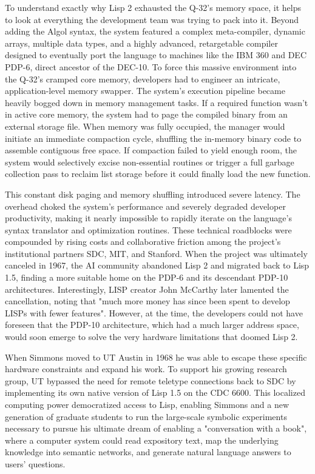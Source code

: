 To understand exactly why Lisp 2 exhausted the Q-32's memory space, it helps to look at everything the development team was trying to pack into it. Beyond adding the Algol syntax, the system featured a complex meta-compiler, dynamic arrays, multiple data types, and a highly advanced, retargetable compiler designed to eventually port the language to machines like the IBM 360 and DEC PDP-6, direct ancestor of the DEC-10. To force this massive environment into the Q-32's cramped core memory, developers had to engineer an intricate, application-level memory swapper. The system's execution pipeline became heavily bogged down in memory management tasks. If a required function wasn't in active core memory, the system had to page the compiled binary from an external storage file. When memory was fully occupied, the manager would initiate an immediate compaction cycle, shuffling the in-memory binary code to assemble contiguous free space. If compaction failed to yield enough room, the system would selectively excise non-essential routines or trigger a full garbage collection pass to reclaim list storage before it could finally load the new function.

This constant disk paging and memory shuffling introduced severe latency. The overhead choked the system's performance and severely degraded developer productivity, making it nearly impossible to rapidly iterate on the language's syntax translator and optimization routines. These technical roadblocks were compounded by rising costs and collaborative friction among the project's institutional partners SDC, MIT, and Stanford. When the project was ultimately canceled in 1967, the AI community abandoned Lisp 2 and migrated back to Lisp 1.5, finding a more suitable home on the PDP-6 and its descendant PDP-10 architectures. Interestingly, LISP creator John McCarthy later lamented the cancellation, noting that "much more money has since been spent to develop LISPs with fewer features". However, at the time, the developers could not have foreseen that the PDP-10 architecture, which had a much larger address space, would soon emerge to solve the very hardware limitations that doomed Lisp 2.

When Simmons moved to UT Austin in 1968 he was able to escape these specific hardware constraints and expand his work. To support his growing research group, UT bypassed the need for remote teletype connections back to SDC by implementing its own native version of Lisp 1.5 on the CDC 6600. This localized computing power democratized access to Lisp, enabling Simmons and a new generation of graduate students to run the large-scale symbolic experiments necessary to pursue his ultimate dream of enabling a "conversation with a book", where a computer system could read expository text, map the underlying knowledge into semantic networks, and generate natural language answers to users' questions. 

